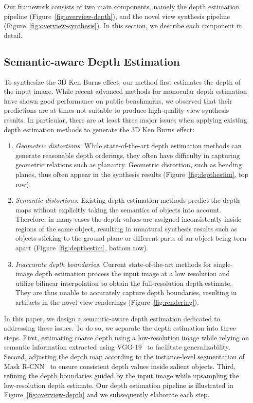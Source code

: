\documentclass[acmtog,authorversion]{acmart}
\begin{document}
\begin{figure*}
    \label{fig:depthestim}
\end{figure*}

Our framework consists of two main components, namely the depth estimation pipeline (Figure~\ref{fig:overview-depth}), and the novel view synthesis pipeline (Figure~\ref{fig:overview-synthesis}). In this section, we describe each component in detail.

\subsection{Semantic-aware Depth Estimation}

To synthesize the 3D Ken Burns effect, our method first estimates the depth of the input image. While recent advanced methods for monocular depth estimation have shown good performance on public benchmarks, we observed that their predictions are at times not suitable to produce high-quality view synthesis results. In particular, there are at least three major issues when applying existing depth estimation methods to generate the 3D Ken Burns effect:

\begin{enumerate}
    \item \textit{Geometric distortions.} While state-of-the-art depth estimation methods can generate reasonable depth orderings, they often have difficulty in capturing geometric relations such as planarity. Geometric distortion, such as bending planes, thus often appear in the synthesis results (Figure~\ref{fig:depthestim}, top row).
    \item \textit{Semantic distortions.} Existing depth estimation methods predict the depth maps without explicitly taking the semantics of objects into account. Therefore, in many cases the depth values are assigned inconsistently inside regions of the same object, resulting in unnatural synthesis results such as objects sticking to the ground plane or different parts of an object being torn apart (Figure~\ref{fig:depthestim}, bottom row).
    \item \textit{Inaccurate depth boundaries.} Current state-of-the-art methods for single-image depth estimation process the input image at a low resolution and utilize bilinear interpolation to obtain the full-resolution depth estimate. They are thus unable to accurately capture depth boundaries, resulting in artifacts in the novel view renderings (Figure~\ref{fig:rendering}).
\end{enumerate}

In this paper, we design a semantic-aware depth estimation dedicated to addressing these issues. To do so, we separate the depth estimation into three steps. First, estimating coarse depth using a low-resolution image while relying on semantic information extracted using VGG-19~\cite{Simonyan_ARXIV_2014} to facilitate generalizability. Second, adjusting the depth map according to the instance-level segmentation of Mask R-CNN~\cite{He_ICCV_2017} to ensure consistent depth values inside salient objects. Third, refining the depth boundaries guided by the input image while upsampling the low-resolution depth estimate. Our depth estimation pipeline is illustrated in Figure~\ref{fig:overview-depth} and we subsequently elaborate each step.
\end{document}
